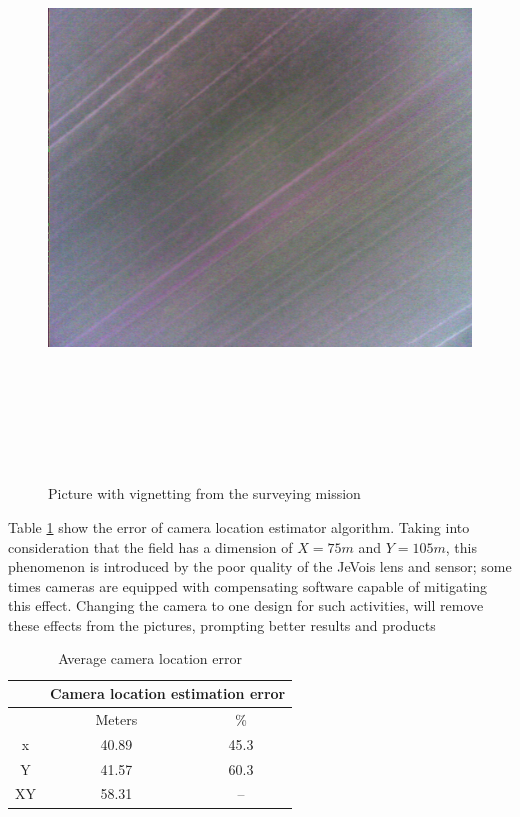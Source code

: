 \begin{figure}[H]
\centering
\includegraphics[width=16cm,height=16cm,keepaspectratio]{imagenes/IMG_62.png}
\caption{Picture with vignetting from the surveying mission}
\label{fig:vignetting}
\end{figure}
Table \ref{Talbe:XYerror} show the error of camera location estimator algorithm. Taking into consideration that the field has a dimension of $X = 75 m$ and $ Y = 105 m$,  this phenomenon is introduced by the poor quality of the JeVois lens and sensor; some times cameras are equipped with compensating software capable of mitigating this effect. Changing the camera to one design for such activities, will remove these effects from the pictures, prompting better results and products
\begin{table}[H]
\centering
\begin{tabular}{|c|c|c|}
\hline
   & \multicolumn{2}{c|}{Camera location estimation error} \\ \hline
   & Meters                     & \%                       \\ \hline
x  & 40.89                      & 45.3                     \\ \hline
Y  & 41.57                      & 60.3                     \\ \hline
XY & 58.31                      & --                       \\ \hline
\end{tabular}
\caption{Average camera location error}
\label{Talbe:XYerror}
\end{table}